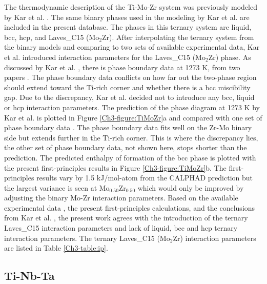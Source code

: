 The thermodynamic description of the Ti-Mo-Zr system was previously modeled by Kar et al. \cite{Kar2008}. The same binary phases used in the modeling by Kar et al. are included in the present database. The phases in this ternary system are liquid, bcc, hcp, and Laves\_C15 (Mo$_{2}$Zr). After interpolating the ternary system from the binary models and comparing to two sets of available experimental data, Kar et al. \cite{Kar2008} introduced interaction parameters for the Laves\_C15 (Mo$_{2}$Zr) phase. As discussed by Kar et al. \cite{Kar2008}, there is phase boundary data at 1273 K, from two papers \cite{Kar2008}. The phase boundary data conflicts on how far out the two-phase region should extend toward the Ti-rich corner and whether there is a bcc miscibility gap. Due to the discrepancy, Kar et al. \cite{Kar2008} decided not to introduce any bcc, liquid or hcp interaction parameters. The prediction of the phase diagram at 1273 K by Kar et al. \cite{Kar2008} is plotted in Figure \ref{Ch3-figure:TiMoZr}a and compared with one set of phase boundary data \cite{Kar2008}. The phase boundary data fits well on the Zr-Mo binary side but extends further in the Ti-rich corner. This is where the discrepancy lies, the other set of phase boundary data, not shown here, stops shorter than the prediction. The predicted enthalpy of formation of the bcc phase is plotted with the present first-principles results in Figure \ref{Ch3-figure:TiMoZr}b. The first-principles results vary by 1.5 kJ/mol-atom from the CALPHAD prediction but the largest variance is seen at Mo$_{0.50}$Zr$_{0.50}$ which would only be improved by adjusting the binary Mo-Zr interaction parameters. Based on the available experimental data \cite{Kar2008}, the present first-principles calculations, and the conclusions from Kar et al. \cite{Kar2008}, the present work agrees with the introduction of the ternary Laves\_C15 interaction parameters and lack of liquid, bcc and hcp ternary interaction parameters. The ternary Laves\_C15 (Mo$_{2}$Zr) interaction parameters are listed in Table \ref{Ch3-table:ip}.

\subsection{Ti-Nb-Ta}

